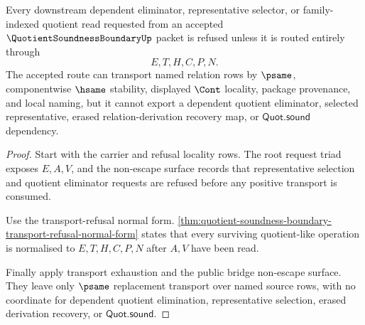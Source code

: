 \begin{theorem}
\label{thm:quotient-soundness-boundary-dependent-eliminator-refusal}
Every downstream dependent eliminator, representative selector, or family-indexed quotient read requested from an accepted $\QuotientSoundnessBoundaryUp$ packet is refused unless it is routed entirely through
$$
E,T,H,C,P,N.
$$
The accepted route can transport named relation rows by $\psame$, componentwise $\hsame$ stability, displayed $\Cont$ locality, package provenance, and local naming, but it cannot export a dependent quotient eliminator, selected representative, erased relation-derivation recovery map, or $\mathsf{Quot.sound}$ dependency.
\end{theorem}
\begin{proof}
Start with the carrier and refusal locality rows. The root request triad exposes $E,A,V$, and the non-escape surface records that representative selection and quotient eliminator requests are refused before any positive transport is consumed.

Use the transport-refusal normal form. \autoref{thm:quotient-soundness-boundary-transport-refusal-normal-form} states that every surviving quotient-like operation is normalised to $E,T,H,C,P,N$ after $A,V$ have been read.

Finally apply transport exhaustion and the public bridge non-escape surface. They leave only $\psame$ replacement transport over named source rows, with no coordinate for dependent quotient elimination, representative selection, erased derivation recovery, or $\mathsf{Quot.sound}$.
\end{proof}

